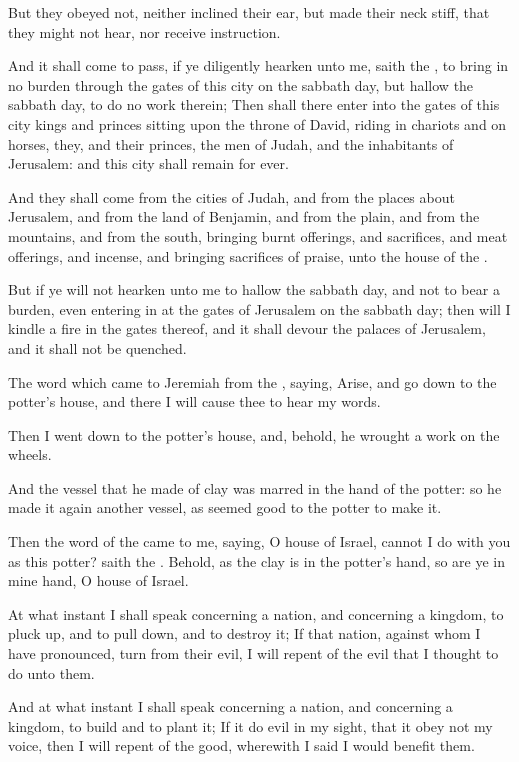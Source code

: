 \Verse But they obeyed not, neither inclined their ear, but made their neck stiff, that they might not hear, nor receive instruction.

\Verse And it shall come to pass, if ye diligently hearken unto me, saith the \LORD, to bring in no burden through the gates of this city on the sabbath day, but hallow the sabbath day, to do no work therein; \Verse Then shall there enter into the gates of this city kings and princes sitting upon the throne of David, riding in chariots and on horses, they, and their princes, the men of Judah, and the inhabitants of Jerusalem: and this city shall remain for ever.

\Verse And they shall come from the cities of Judah, and from the places about Jerusalem, and from the land of Benjamin, and from the plain, and from the mountains, and from the south, bringing burnt offerings, and sacrifices, and meat offerings, and incense, and bringing sacrifices of praise, unto the house of the \LORD.

\Verse But if ye will not hearken unto me to hallow the sabbath day, and not to bear a burden, even entering in at the gates of Jerusalem on the sabbath day; then will I kindle a fire in the gates thereof, and it shall devour the palaces of Jerusalem, and it shall not be quenched.


\Chapter
\Verse The word which came to Jeremiah from the \LORD, saying, \Verse Arise, and go down to the potter's house, and there I will cause thee to hear my words.

\Verse Then I went down to the potter's house, and, behold, he wrought a work on the wheels.

\Verse And the vessel that he made of clay was marred in the hand of the potter: so he made it again another vessel, as seemed good to the potter to make it.

\Verse Then the word of the \LORD came to me, saying, \Verse O house of Israel, cannot I do with you as this potter? saith the \LORD. Behold, as the clay is in the potter's hand, so are ye in mine hand, O house of Israel.

\Verse At what instant I shall speak concerning a nation, and concerning a kingdom, to pluck up, and to pull down, and to destroy it; \Verse If that nation, against whom I have pronounced, turn from their evil, I will repent of the evil that I thought to do unto them.

\Verse And at what instant I shall speak concerning a nation, and concerning a kingdom, to build and to plant it; \Verse If it do evil in my sight, that it obey not my voice, then I will repent of the good, wherewith I said I would benefit them.


